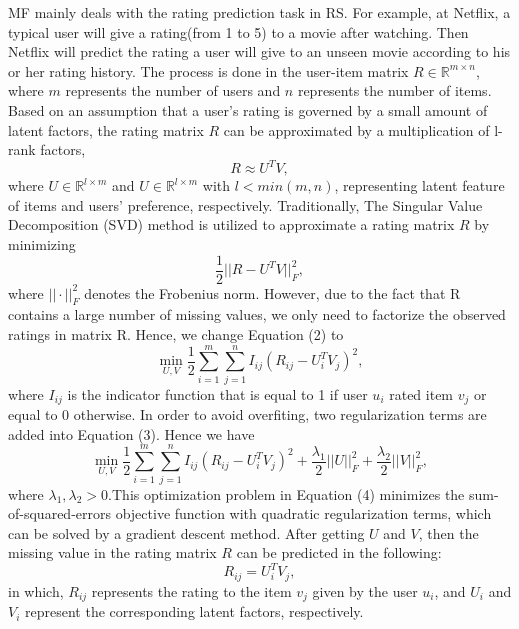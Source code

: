 \documentclass[10pt,onecolumn,conference]{IEEEtran}
\begin{document}
MF mainly deals with the rating prediction task in RS. For example, at Netflix, a typical user will give a rating(from 1 to 5) to a movie after watching. Then Netflix will predict the rating a user will give to an unseen movie according to his or her rating history. The process is done in the user-item matrix  $R \in \mathbb{R}^{m \times n}$, where $m$ represents the number of users and $n$ represents the number of items. Based on an assumption that a user's rating is governed by a small amount of latent factors, the rating matrix $R$ can be approximated by a multiplication of l-rank factors,
\begin{equation}
R \approx U^TV,
\end{equation}
where $U \in \mathbb{R}^{l \times m}$ and {$U \in \mathbb{R}^{l \times m}$} with $l < min(m, n)$, representing latent feature of items and users' preference, respectively. Traditionally, The Singular Value Decomposition (SVD) method is utilized to approximate a rating matrix $R$ by minimizing
\begin{equation}
\frac{1}{2}||R - U^TV||_F^2,
\end{equation}
where $||\cdot||_F^2$ denotes the Frobenius norm. However, due to the fact that R contains a large number of missing values, we only need to factorize the observed ratings in matrix R. Hence, we change Equation (2) to
\begin{equation}
\min_{U,V}\frac{1}{2}\sum_{i=1}^{m}\sum_{j=1}^{n}I_{ij}(R_{ij} - U_i^TV_j)^2,
\end{equation} 
where $I_{ij}$ is the indicator function that is equal to 1 if user $u_i$ rated item $v_j$ or equal to 0 otherwise. In order to avoid overfiting, two regularization terms are added into Equation (3). Hence we have
\begin{equation}
\min_{U,V}\frac{1}{2}\sum_{i=1}^{m}\sum_{j=1}^{n}I_{ij}(R_{ij} - U_i^TV_j)^2 + \frac{\lambda_1}{2}||U||_F^2 + \frac{\lambda_2}{2}||V||_F^2,
\end{equation} 
where $\lambda_1, \lambda_2 > 0 $.This optimization problem in Equation (4) minimizes the sum-of-squared-errors objective function with quadratic regularization terms, which can be solved by a gradient descent method. After getting $U$ and $V$, then the missing value in the rating matrix $R$ can be predicted in the following:
\begin{equation}
R_{ij} = U_i^TV_j,
\end{equation}
in which, $R_{ij}$ represents the rating to the item $v_j$ given by the user $u_i$, and $U_i$ and $V_i$ represent the corresponding latent factors, respectively.
\end{document}
